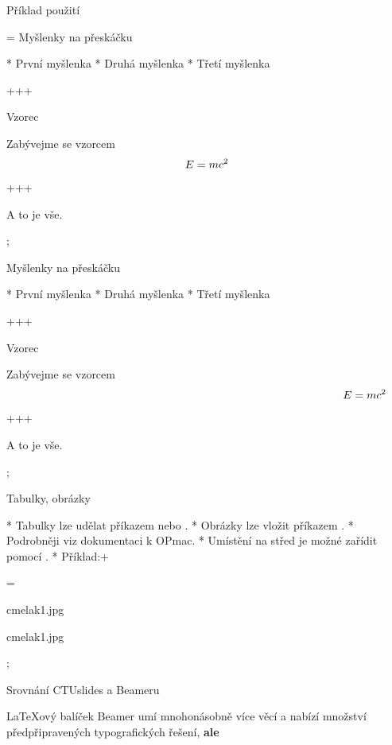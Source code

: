 \sec Příklad použití \code{\\pshow}

\pg=\typosize[13/15]\begtt
\secc Myšlenky na přeskáčku

* { První myšlenka}
* { Druhá myšlenka}
* { Třetí myšlenka}

\pg+\pg+\pg+

\secc Vzorec

Zabývejme se vzorcem
$$ 
  E = {\pshow5 m}{\pshow6 c^2}
$$

\pg+\pg+\pg+

A to je vše.

\pg;
\endtt

\vskip-12cm \null 

\leftskip=10cm 
\def\s{\hskip10cm}

\secc \s Myšlenky na přeskáčku

* { První myšlenka}
* { Druhá myšlenka}
* { Třetí myšlenka}

\pg+\pg+\pg+

\secc\s Vzorec

Zabývejme se vzorcem
$$
  \s E = {\pshow5 m}{\pshow6 c^2} 
$$

\pg+\pg+\pg+

A to je vše.

\pg; %

\restore

\sec Tabulky, obrázky

* Tabulky lze udělat příkazem \code{\\table} nebo \code{\\ctable}.
* Obrázky lze vložit příkazem \code{\\inspic}.
* Podrobněji viz dokumentaci k OPmac.
* Umístění na střed je možné zařídit pomocí \code{\\centerline{}}.
* Příklad:\pg+

\pg=\begtt
\centerline{\picw=5cm \inspic cmelak1.jpg }
\endtt

\medskip
\centerline{\picw=5cm \inspic cmelak1.jpg } 

\pg; %

\sec Srovnání CTUslides a Beameru

\LaTeX{}ový balíček Beamer umí mnohonásobně více věcí a nabízí množství
předpřipravených typografických řešení, {\bf\Red ale}

